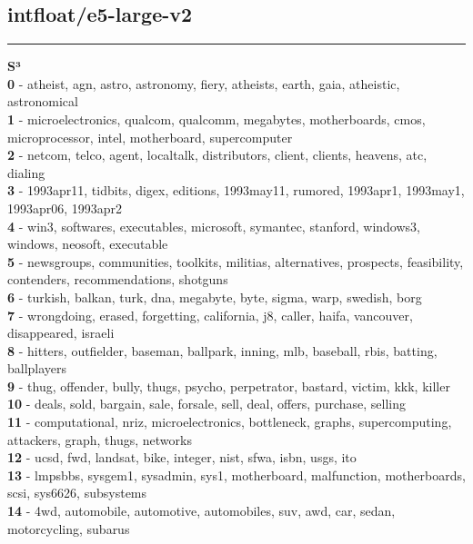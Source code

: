 \subsection{intfloat/e5-large-v2}\vspace{2mm}
\hrule\vspace{2mm}
\noindent
\textbf{S³}\vspace{2mm}\\
\vspace{2mm}
\noindent
\textbf{0} - atheist, agn, astro, astronomy, fiery, atheists, earth, gaia, atheistic, astronomical\\
\textbf{1} - microelectronics, qualcom, qualcomm, megabytes, motherboards, cmos, microprocessor, intel, motherboard, supercomputer\\
\textbf{2} - netcom, telco, agent, localtalk, distributors, client, clients, heavens, atc, dialing\\
\textbf{3} - 1993apr11, tidbits, digex, editions, 1993may11, rumored, 1993apr1, 1993may1, 1993apr06, 1993apr2\\
\textbf{4} - win3, softwares, executables, microsoft, symantec, stanford, windows3, windows, neosoft, executable\\
\textbf{5} - newsgroups, communities, toolkits, militias, alternatives, prospects, feasibility, contenders, recommendations, shotguns\\
\textbf{6} - turkish, balkan, turk, dna, megabyte, byte, sigma, warp, swedish, borg\\
\textbf{7} - wrongdoing, erased, forgetting, california, j8, caller, haifa, vancouver, disappeared, israeli\\
\textbf{8} - hitters, outfielder, baseman, ballpark, inning, mlb, baseball, rbis, batting, ballplayers\\
\textbf{9} - thug, offender, bully, thugs, psycho, perpetrator, bastard, victim, kkk, killer\\
\textbf{10} - deals, sold, bargain, sale, forsale, sell, deal, offers, purchase, selling\\
\textbf{11} - computational, nriz, microelectronics, bottleneck, graphs, supercomputing, attackers, graph, thugs, networks\\
\textbf{12} - ucsd, fwd, landsat, bike, integer, nist, sfwa, isbn, usgs, ito\\
\textbf{13} - lmpsbbs, sysgem1, sysadmin, sys1, motherboard, malfunction, motherboards, scsi, sys6626, subsystems\\
\textbf{14} - 4wd, automobile, automotive, automobiles, suv, awd, car, sedan, motorcycling, subarus\\
